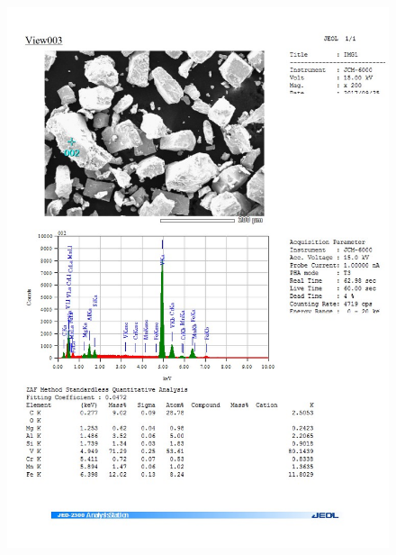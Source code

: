 \documentclass[12pt]{article}
\begin{document}
\begin{figure}[H]
	\includegraphics[width = \linewidth]{./pictures/dot_spec_2.jpg}
\end{figure}
\end{document}
